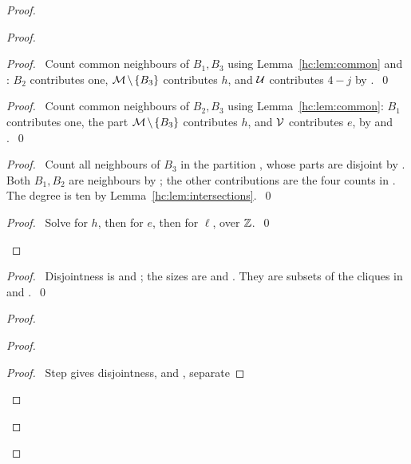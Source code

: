 \begin{mergedproofsection}
\begin{proof}
\begin{proof}
  \begin{proof}\pf\ Count common neighbours of $B_1,B_3$ using
   Lemma~\ref{hc:lem:common} and :
   $B_2$ contributes one, ${\mathcal M}\mathbin{\mkern-1.5mu\setminus\mkern-1.5mu}\{B_3\}$ contributes $h$, and
   ${\mathcal U}$ contributes $4-j$ by .~\qed\end{proof}
  \begin{proof}\pf\ Count common neighbours of $B_2,B_3$ using
   Lemma~\ref{hc:lem:common}: $B_1$ contributes one, the part
   ${\mathcal M}\mathbin{\mkern-1.5mu\setminus\mkern-1.5mu}\{B_3\}$ contributes $h$, and ${\mathcal V}$ contributes $e$,
   by  and .~\qed\end{proof}
  \begin{proof}\pf\ Count all neighbours of $B_3$ in the partition
   , whose parts are disjoint by
   . Both $B_1,B_2$ are neighbours by
   ; the other contributions are the four
   counts in . The degree is ten by
   Lemma~\ref{hc:lem:intersections}.~\qed\end{proof}
  \qedstep
  \begin{proof}\pf\ Solve  for $h$, then
    for $e$, then 
   for $\ell$, over ${\mathbb Z}$.~\qed\end{proof}
 \end{proof}
 \begin{proof}\pf\ Disjointness is  and
  ; the sizes are  and
  . They are subsets of the cliques in
   and .~\qed\end{proof}
 \begin{proof}
  \begin{proof}
   \begin{proof}\pf\ Step  gives disjointness,
    and ,  separate

\end{proof}
\end{proof}
\end{proof}
\end{proof}
\end{mergedproofsection}
